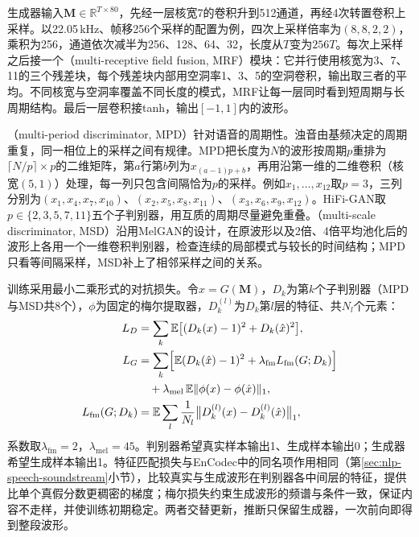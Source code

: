 生成器输入$\bm{M}\in\mathbb{R}^{T\times80}$，先经一层核宽7的卷积升到512通道，再经4次转置卷积上采样。以22.05\,kHz、帧移256个采样的配置为例，四次上采样倍率为$(8,8,2,2)$，乘积为256，通道依次减半为256、128、64、32，长度从$T$变为$256T$。每次上采样之后接一个（multi-receptive field fusion, MRF）模块：它并行使用核宽为3、7、11的三个残差块，每个残差块内部用空洞率1、3、5的空洞卷积，输出取三者的平均。不同核宽与空洞率覆盖不同长度的模式，MRF让每一层同时看到短周期与长周期结构。最后一层卷积接tanh，输出$[-1,1]$内的波形。

（multi-period discriminator, MPD）针对语音的周期性。浊音由基频决定的周期重复，同一相位上的采样之间有规律。MPD把长度为$N$的波形按周期$p$重排为$\lceil N/p\rceil\times p$的二维矩阵，第$a$行第$b$列为$x_{(a-1)p+b}$，再用沿第一维的二维卷积（核宽$(5,1)$）处理，每一列只包含间隔恰为$p$的采样。例如$x_1,\ldots,x_{12}$取$p=3$，三列分别为$(x_1,x_4,x_7,x_{10})$、$(x_2,x_5,x_8,x_{11})$、$(x_3,x_6,x_9,x_{12})$。HiFi-GAN取$p\in\{2,3,5,7,11\}$五个子判别器，用互质的周期尽量避免重叠。（multi-scale discriminator, MSD）沿用MelGAN的设计\cite{nlp-speech-kumar2019melgan}，在原波形以及2倍、4倍平均池化后的波形上各用一个一维卷积判别器，检查连续的局部模式与较长的时间结构；MPD只看等间隔采样，MSD补上了相邻采样之间的关系。

训练采用最小二乘形式的对抗损失。令$\hat x=G(\bm{M})$，$D_k$为第$k$个子判别器（MPD与MSD共8个），$\phi$为固定的梅尔提取器，$D_k^{(l)}$为$D_k$第$l$层的特征、共$N_l$个元素：
\begin{equation}
\begin{aligned}
 L_D&=\sum_k\mathbb{E}\bigl[(D_k(x)-1)^2+D_k(\hat x)^2\bigr],\\
 L_G&=\sum_k\Bigl[\mathbb{E}(D_k(\hat x)-1)^2+\lambda_{\mathrm{fm}}L_{\mathrm{fm}}(G;D_k)\Bigr]\\
 &\quad+\lambda_{\mathrm{mel}}\,\mathbb{E}\lVert\phi(x)-\phi(\hat x)\rVert_1,\\
 L_{\mathrm{fm}}(G;D_k)&=\mathbb{E}\sum_{l}\frac{1}{N_l}\bigl\lVert D_k^{(l)}(x)-D_k^{(l)}(\hat x)\bigr\rVert_1,
\end{aligned}
\label{eq:nlp-speech-hifigan}
\end{equation}
系数取$\lambda_{\mathrm{fm}}=2$，$\lambda_{\mathrm{mel}}=45$。判别器希望真实样本输出1、生成样本输出0；生成器希望生成样本输出1。特征匹配损失与EnCodec中的同名项作用相同（第\ref{sec:nlp-speech-soundstream}小节），比较真实与生成波形在判别器各中间层的特征，提供比单个真假分数更稠密的梯度；梅尔损失约束生成波形的频谱与条件一致，保证内容不走样，并使训练初期稳定。两者交替更新，推断只保留生成器，一次前向即得到整段波形。

